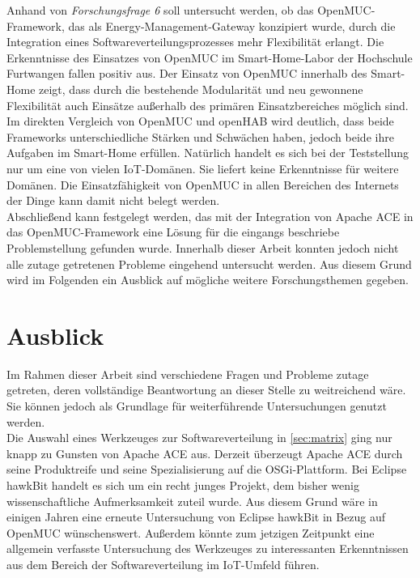 Anhand von \textit{Forschungsfrage 6} soll untersucht werden, ob das OpenMUC-Framework, das als Energy-Management-Gateway konzipiert wurde,
durch die Integration eines Softwareverteilungsprozesses mehr Flexibilität erlangt.
Die Erkenntnisse des Einsatzes von OpenMUC im Smart-Home-Labor der Hochschule Furtwangen fallen positiv aus.
Der Einsatz von OpenMUC innerhalb des Smart-Home zeigt, dass durch die bestehende Modularität und neu gewonnene Flexibilität 
auch Einsätze außerhalb des primären Einsatzbereiches möglich sind.
Im direkten Vergleich von OpenMUC und openHAB wird deutlich, dass beide Frameworks unterschiedliche Stärken und Schwächen haben,
jedoch beide ihre Aufgaben im Smart-Home erfüllen.
Natürlich handelt es sich bei der Teststellung nur um eine von vielen \ac{IoT}-Domänen. 
Sie liefert keine Erkenntnisse für weitere Domänen.
Die Einsatzfähigkeit von OpenMUC in allen Bereichen des Internets der Dinge kann damit nicht belegt werden.\\

Abschließend kann festgelegt werden, das mit der Integration von Apache ACE in das OpenMUC-Framework eine Lösung für die eingangs beschriebe Problemstellung gefunden wurde.
Innerhalb dieser Arbeit konnten jedoch nicht alle zutage getretenen Probleme eingehend untersucht werden.
Aus diesem Grund wird im Folgenden ein Ausblick auf mögliche weitere Forschungsthemen gegeben.

\section{Ausblick}

Im Rahmen dieser Arbeit sind verschiedene Fragen und Probleme zutage getreten, deren vollständige Beantwortung an dieser Stelle zu weitreichend wäre.
Sie können jedoch als Grundlage für weiterführende Untersuchungen genutzt werden.\\

Die Auswahl eines Werkzeuges zur Softwareverteilung in \autoref{sec:matrix} ging nur knapp zu Gunsten von Apache ACE aus.
Derzeit überzeugt Apache ACE durch seine Produktreife und seine Spezialisierung auf die \ac{OSGi}-Plattform.
Bei Eclipse hawkBit handelt es sich um ein recht junges Projekt, dem bisher wenig wissenschaftliche Aufmerksamkeit zuteil wurde.
Aus diesem Grund wäre in einigen Jahren eine erneute Untersuchung von Eclipse hawkBit in Bezug auf OpenMUC wünschenswert.
Außerdem könnte zum jetzigen Zeitpunkt eine allgemein verfasste Untersuchung des Werkzeuges zu interessanten Erkenntnissen aus dem Bereich der Softwareverteilung
im \ac{IoT}-Umfeld führen.\\


